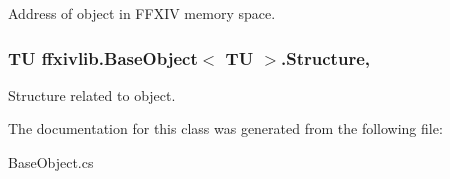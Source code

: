 Address of object in F\-F\-X\-I\-V memory space. 

\hypertarget{classffxivlib_1_1_base_object_3_01_t_u_01_4_a65d04f0f244699a122f3fbe3f35a86e3}{
\subsubsection[{Structure}]{\setlength{\rightskip}{0pt plus 5cm}T\-U ffxivlib.\-Base\-Object$<$ T\-U $>$.Structure\hspace{0.3cm}{\ttfamily [get]}, {\ttfamily [set]}}}\label{classffxivlib_1_1_base_object_3_01_t_u_01_4_a65d04f0f244699a122f3fbe3f35a86e3}


Structure related to object. 



The documentation for this class was generated from the following file\-:\begin{DoxyCompactItemize}
\item 
Base\-Object.\-cs\end{DoxyCompactItemize}
